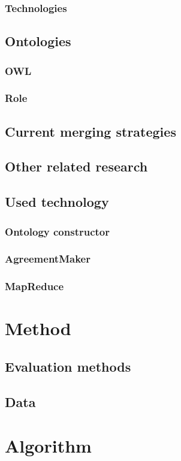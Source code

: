 \documentclass{article}
\begin{document}
 \subsubsection{Technologies}
 \subsection{Ontologies}
 \subsubsection{OWL}
 \subsubsection{Role}
 \subsection{Current merging strategies}
 \subsection{Other related research}
 \subsection{Used technology}
 \subsubsection{Ontology constructor}
 \subsubsection{AgreementMaker}
 \subsubsection{MapReduce}
 
 \section{Method}
 \subsection{Evaluation methods}
 \subsection{Data}
 
 \section{Algorithm}
\end{document}
